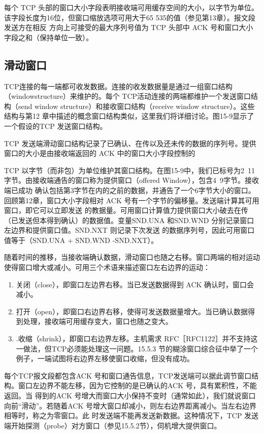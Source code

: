 每个 TCP 头部的窗口大小字段表明接收端可用缓存空间的大小，以字节为单位。该字段长度为16位，但窗口缩放选项可用大于65 535的值（参见第13章）。报文段发送方在相反
方向上可接受的最大序列号值为 TCP 头部中 ACK 号和窗口大小字段之和（保持单位一致）。

\subsection{滑动窗口}
TCP连接的每一端都可收发数据。连接的收发数据量是通过一组窗口结构（windowstructure）来维护的。每个 TCP活动连接的两端都维护一个发送窗口结构（send window
structure）和接收窗口结构（receive window structure）。这些结构与第12 章中描述的概念窗口结构类似，这里我们将详细讨论。图15-9显示了一个假设的TCP 发送窗口结构。

TCP 发送端滑动窗口结构记录了已确认、在传以及还未传的数据的序列号。提供窗口的大小是由接收端返回的 ACK 中的窗口大小字段控制的

TCP 以字节（而非包）为单位维护其窗口结构。在图15-9中，我们已标号为2~11字节。由接收端通告的窗口称为提供窗口（offered Window），包含4~9字节。接收端已成功
确认包括第3字节在内的之前的数据，并通告了一个6字节大小的窗口。回顾第12章，窗口大小字段相对 ACK 号有一个字节的偏移量。发送端计算其可用窗口，即它可以立即发送
的教据量。可用窗口计算值力提供窗口大小破去在传（已发送但本得到确认）的数据值。变量SND.UNA 和SND.WND 分别记录窗口左边界和提供窗口值。SND.NXT 则记录下次发送
的数据序列号，因此可用窗口值等于（SND.UNA + SND.WND -SND.NXT）。

随着时间的推移，当接收端确认数据，滑动窗口也随之右移。窗口两端的相对运动使得窗口增大或减小。可用三个术语来描述窗口左右边界的运动：
\begin{enumerate}
    \item 关闭（close），即窗口左边界右移。当已发送数据得到 ACK 确认时，窗口会减小。
    \item 打开（open），即窗口右边界右移，使得可发送数据量增大。当已确认数据得到处理，接收端可用缓存变大，窗口也随之变大。
    \item .收缩（shrink），即窗口右边界左移。主机需求 RFC［RFC1122］并不支持这一做法，但TCP必须能处理这一问题。15.5.3 节的糊涂窗口综合征中举了一个例子，一端试图将右边界左移使窗口收缩，但没有成功。
\end{enumerate}

每个TCP报文段都包含ACK 号和窗口通告信息，TCP发送端可以据此调节窗口结构。窗口左边界不能左移，因为它控制的是已确认的ACK 号，具有累积性，不能返回。当
得到的ACK 号增大而窗口大小保持不变时（通常如此），我们就说窗口向前“滑动”。若随着ACK 号增大窗口却减小，则左右边界距离减小。当左右边界相等时，称之为零窗口。此
时发送端不能再发送新数据。这种情况下，TCP 发送端开始探测（probe）对方窗口（参见15.5.2节），伺机增大提供窗口。

